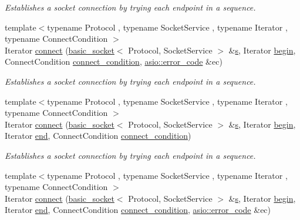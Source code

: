 \begin{DoxyCompactItemize}
\begin{DoxyCompactList}\small\item\em Establishes a socket connection by trying each endpoint in a sequence. \end{DoxyCompactList}\item 
{\footnotesize template$<$typename Protocol , typename Socket\+Service , typename Iterator , typename Connect\+Condition $>$ }\\Iterator \hyperlink{group__connect_gab16905fe7662fdaa7410ea98e4a5d38a}{connect} (\hyperlink{classasio_1_1basic__socket}{basic\+\_\+socket}$<$ Protocol, Socket\+Service $>$ \&\hyperlink{group__async__connect_ga31ab74b9ea6c77932dddd016cfc7920a}{s}, Iterator \hyperlink{group__async__connect_ga7055bca9225050c030c19c7dc926fa53}{begin}, Connect\+Condition \hyperlink{group__async__connect_ga47e3dda205dfba3553f4c7e005897687}{connect\+\_\+condition}, \hyperlink{classasio_1_1error__code}{asio\+::error\+\_\+code} \&ec)
\begin{DoxyCompactList}\small\item\em Establishes a socket connection by trying each endpoint in a sequence. \end{DoxyCompactList}\item 
{\footnotesize template$<$typename Protocol , typename Socket\+Service , typename Iterator , typename Connect\+Condition $>$ }\\Iterator \hyperlink{group__connect_ga85284052d2233e8ea3993625e9f28184}{connect} (\hyperlink{classasio_1_1basic__socket}{basic\+\_\+socket}$<$ Protocol, Socket\+Service $>$ \&\hyperlink{group__async__connect_ga31ab74b9ea6c77932dddd016cfc7920a}{s}, Iterator \hyperlink{group__async__connect_ga7055bca9225050c030c19c7dc926fa53}{begin}, Iterator \hyperlink{group__async__connect_gadb6ad0193229ae84828688e812cd325c}{end}, Connect\+Condition \hyperlink{group__async__connect_ga47e3dda205dfba3553f4c7e005897687}{connect\+\_\+condition})
\begin{DoxyCompactList}\small\item\em Establishes a socket connection by trying each endpoint in a sequence. \end{DoxyCompactList}\item 
{\footnotesize template$<$typename Protocol , typename Socket\+Service , typename Iterator , typename Connect\+Condition $>$ }\\Iterator \hyperlink{group__connect_ga309aa819fa86c14156c10c5374eb0d24}{connect} (\hyperlink{classasio_1_1basic__socket}{basic\+\_\+socket}$<$ Protocol, Socket\+Service $>$ \&\hyperlink{group__async__connect_ga31ab74b9ea6c77932dddd016cfc7920a}{s}, Iterator \hyperlink{group__async__connect_ga7055bca9225050c030c19c7dc926fa53}{begin}, Iterator \hyperlink{group__async__connect_gadb6ad0193229ae84828688e812cd325c}{end}, Connect\+Condition \hyperlink{group__async__connect_ga47e3dda205dfba3553f4c7e005897687}{connect\+\_\+condition}, \hyperlink{classasio_1_1error__code}{asio\+::error\+\_\+code} \&ec)

\end{DoxyCompactItemize}

